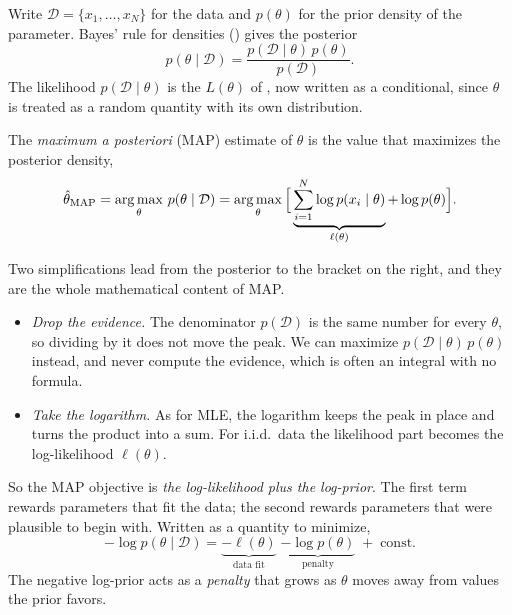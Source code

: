 Write $\mathcal{D} = \{x_1, \dots, x_N\}$ for the data and $p(\theta)$
for the prior density of the parameter. Bayes' rule for densities
() gives the posterior
\[
  p(\theta \mid \mathcal{D})
  = \frac{p(\mathcal{D} \mid \theta)\, p(\theta)}{p(\mathcal{D})} .
\]
The likelihood $p(\mathcal{D} \mid \theta)$ is the $L(\theta)$ of
, now written as a conditional, since $\theta$ is treated
as a random quantity with its own distribution.

\begin{definition}
  \label{def:map}
  The \emph{maximum a posteriori} (MAP) estimate of $\theta$ is the
  value that maximizes the posterior density,
  \[
    \hat\theta_{\text{MAP}}
    = \operatorname*{arg\,max}_{\theta}\, p(\theta \mid \mathcal{D})
    = \operatorname*{arg\,max}_{\theta}\,
      \Bigl[\, \underbrace{\sum_{i=1}^{N} \log p(x_i \mid \theta)}_{\ell(\theta)}
      + \log p(\theta) \Bigr] .
  \]
\end{definition}

Two simplifications lead from the posterior to the bracket on the right,
and they are the whole mathematical content of MAP.
\begin{itemize}
  \item \emph{Drop the evidence.} The denominator $p(\mathcal{D})$ is the
    same number for every $\theta$, so dividing by it does not move the
    peak. We can maximize $p(\mathcal{D} \mid \theta)\,p(\theta)$ instead,
    and never compute the evidence, which is often an integral with no
    formula.
  \item \emph{Take the logarithm.} As for MLE, the logarithm keeps the peak
    in place and turns the product into a sum. For i.i.d.\ data the
    likelihood part becomes the log-likelihood $\ell(\theta)$.
\end{itemize}
So the MAP objective is \emph{the log-likelihood plus the log-prior}.
The first term rewards parameters that fit the data; the second rewards
parameters that were plausible to begin with. Written as a quantity to
minimize,
\begin{equation}
  -\log p(\theta \mid \mathcal{D})
  = \underbrace{-\ell(\theta)}_{\text{data fit}}
  \;\underbrace{-\log p(\theta)}_{\text{penalty}}
  \;+\; \text{const} .
  \label{eq:ch06-map-objective}
\end{equation}
The negative log-prior acts as a \emph{penalty} that grows as $\theta$
moves away from values the prior favors.

